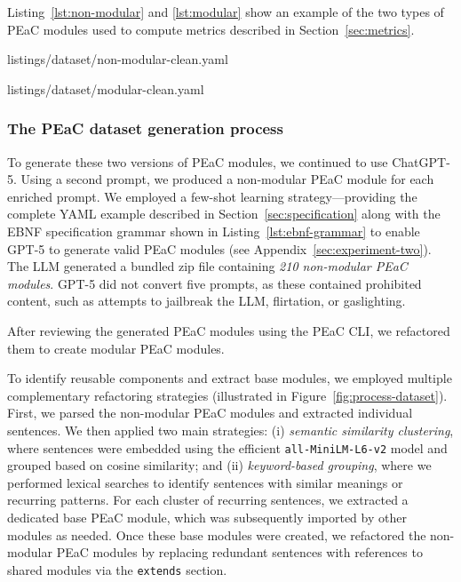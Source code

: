 Listing~\ref{lst:non-modular} and \ref{lst:modular} show an example of the two types of PEaC modules used to compute metrics described in Section~\ref{sec:metrics}.



{listings/dataset/non-modular-clean.yaml}


{listings/dataset/modular-clean.yaml}



\subsubsection{The PEaC dataset generation process}
To generate these two versions of PEaC modules, we continued to use ChatGPT-5. 
Using a second prompt, we produced a non-modular PEaC module for each enriched prompt.
We employed a few-shot learning strategy---providing the complete YAML example described in Section~\ref{sec:specification} along with the EBNF specification grammar shown in Listing~\ref{lst:ebnf-grammar} to enable GPT-5 to generate valid PEaC modules (see Appendix~\ref{sec:experiment-two}). The LLM generated a bundled zip file containing \textit{210 non-modular PEaC modules}. GPT-5 did not convert five prompts, as these contained prohibited content, such as attempts to jailbreak the LLM, flirtation, or gaslighting.

After reviewing the generated PEaC modules using the PEaC CLI, we refactored them to create modular PEaC modules.

To identify reusable components and extract base modules, we employed multiple complementary refactoring strategies (illustrated in Figure~\ref{fig:process-dataset}). First, we parsed the non-modular PEaC modules and extracted individual sentences. We then applied two main strategies: (i) \textit{semantic similarity clustering}, where sentences were embedded using the efficient \texttt{all-MiniLM-L6-v2} model and grouped based on cosine similarity; and (ii) \textit{keyword-based grouping}, where we performed lexical searches to identify sentences with similar meanings or recurring patterns. For each cluster of recurring sentences, we extracted a dedicated base PEaC module, which was subsequently imported by other modules as needed. Once these base modules were created, we refactored the non-modular PEaC modules by replacing redundant sentences with references to shared modules via the \texttt{extends} section.

